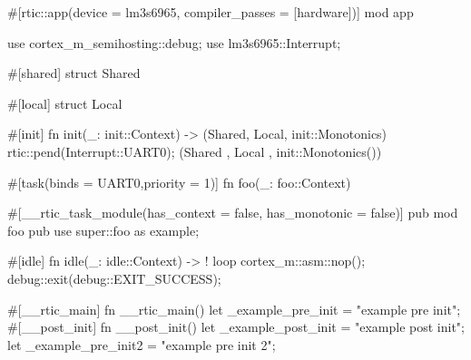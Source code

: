 #[rtic::app(device = lm3s6965, compiler_passes = [hardware])]
mod app {
    use cortex_m_semihosting::debug;
    use lm3s6965::Interrupt;

    #[shared]
    struct Shared {}

    #[local]
    struct Local {}

    #[init]
    fn init(_: init::Context) -> (Shared, Local, init::Monotonics) {
        rtic::pend(Interrupt::UART0);
        (Shared {}, Local {}, init::Monotonics())
    }

    #[task(binds = UART0,priority = 1)]
    fn foo(_: foo::Context) {
    }

    #[__rtic_task_module(has_context = false, has_monotonic = false)]
    pub mod foo {
        pub use super::foo as example;
    }

    #[idle]
    fn idle(_: idle::Context) -> ! {
        loop {
            cortex_m::asm::nop();
            debug::exit(debug::EXIT_SUCCESS);
        }
    }

    #[__rtic_main]
    fn __rtic_main(){
        let _example_pre_init = "example pre init";
        #[__post_init]
        fn __post_init() {
            let _example_post_init = "example post init";
        }
        let _example_pre_init2 = "example pre init 2";
    }
}
